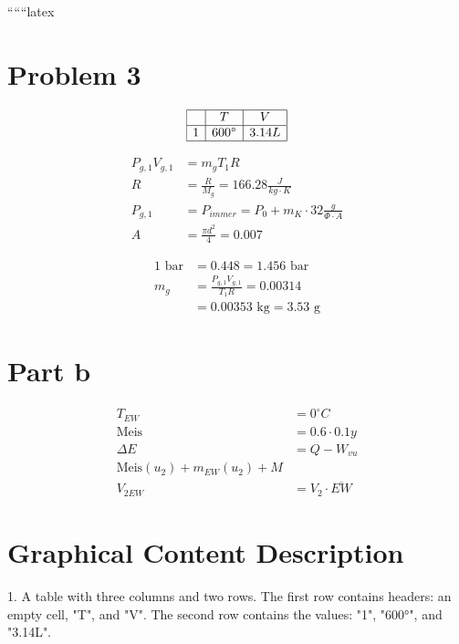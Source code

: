 
``````latex


\section*{Problem 3}

\[
\begin{array}{|c|c|c|}
\hline
 & T & V \\
\hline
1 & 600^\circ & 3.14L \\
\hline
\end{array}
\]

\[
\begin{aligned}
    P_{g,1} V_{g,1} &= m_{g} T_{1} R \\
    R &= \frac{R}{M_{g}} = 166.28 \frac{J}{kg \cdot K} \\
    P_{g,1} &= P_{immer} = P_{0} + m_{K} \cdot 32 \frac{g}{\Phi \cdot A} \\
    A &= \frac{\pi d^2}{4} = 0.007
\end{aligned}
\]

\[
\begin{aligned}
    1 \text{ bar} &= 0.448 = 1.456 \text{ bar} \\
    m_{g} &= \frac{P_{g,1} V_{g,1}}{T_{1} R} = 0.00314 \\
    &= 0.00353 \text{ kg} = 3.53 \text{ g}
\end{aligned}
\]

\section*{Part b}

\[
\begin{aligned}
    T_{EW} &= 0^\circ C \\
    \text{Meis} &= 0.6 \cdot 0.1 y \\
    \Delta E &= Q - W_{vu} \\
    \text{Meis}(u_2) + m_{EW}(u_2) + M \\
    V_{2EW} &= V_{2} \cdot \overline{EW}
\end{aligned}
\]

\section*{Graphical Content Description}

1. A table with three columns and two rows. The first row contains headers: an empty cell, "T", and "V". The second row contains the values: "1", "600°", and "3.14L".

